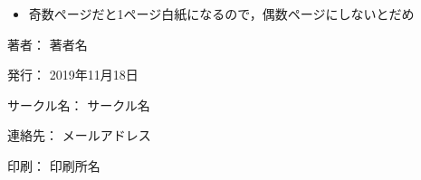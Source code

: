 \documentclass[
  xelatex,ja=standard, b5paper]{bxjsbook}
\providecommand{\tightlist}{%
  \setlength{\itemsep}{0pt}\setlength{\parskip}{0pt}}
\begin{document}
\begin{itemize}
\tightlist
\item
  奇数ページだと1ページ白紙になるので，偶数ページにしないとだめ
\end{itemize}

\clearpage
{}
\begin{flushright}
\begin{minipage}{0.5\hsize}
\begin{description}
  \item{著者：} 著者名
  \item{発行：} 2019年11月18日
  \item{サークル名：} サークル名
  \item{連絡先：} メールアドレス
  \item{印刷：} 印刷所名
\end{description}
\end{minipage}
\end{flushright}
\clearpage
\end{document}
